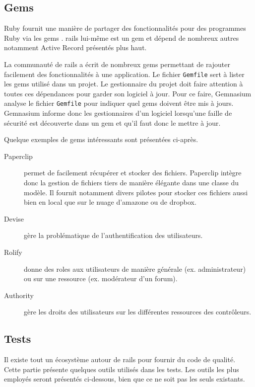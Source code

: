 \subsection{Gems}
\label{gems}
Ruby fournit une manière de partager des fonctionnalités pour des programmes Ruby via les \glspl{gem} \cite{gem}. \gls{rails} lui-même est un \gls{gem} et dépend de nombreux autres notamment Active Record présentés plus haut.

\label{gemnasium}
La communauté de \gls{rails} a écrit de nombreux \glspl{gem}  permettant de rajouter facilement des fonctionnalités à une application. Le fichier \texttt{Gemfile} sert à lister les \glspl{gem}  utilisé dans un projet. Le gestionnaire du projet doit faire attention à toutes ces dépendances pour garder son logiciel à jour. Pour ce faire, Gemnasium analyse le fichier \texttt{Gemfile} pour indiquer quel \glspl{gem}  doivent être mis à jours. Gemnasium informe donc les gestionnaires d'un logiciel lorsqu'une faille de sécurité est découverte dans un \gls{gem} et qu'il faut donc le mettre à jour.

Quelque exemples de \glspl{gem} intéressants sont présentées ci-après.
\begin{description}
  \item[Paperclip \cite{paperclip}] permet de facilement récupérer et stocker des fichiers. Paperclip intègre donc la gestion de fichiers tiers de manière élégante dans une classe du modèle. Il fournit notamment divers pilotes pour stocker ces fichiers aussi bien en local que sur le nuage d'amazone ou de dropbox.
  \item[Devise \cite{devise}] gère la problématique de l'authentification des utilisateurs.
  \item[Rolify \cite{rolify}] donne des \glspl{role} aux utilisateurs de manière générale (ex. administrateur) ou sur une ressource (ex. modérateur d'un forum).\label{rolify}
  \item[Authority \cite{authority}] gère les droits des utilisateurs sur les différentes ressources des contrôleurs. \label{authority}
\end{description}

\subsection{Tests}
\label{rails-tests}
Il existe tout un écosystème autour de \gls{rails} pour fournir du code de qualité. Cette partie présente quelques outils utilisés dans les tests. Les outils les plus employés seront présentés ci-dessous, bien que ce ne soit pas les seuls existants.

